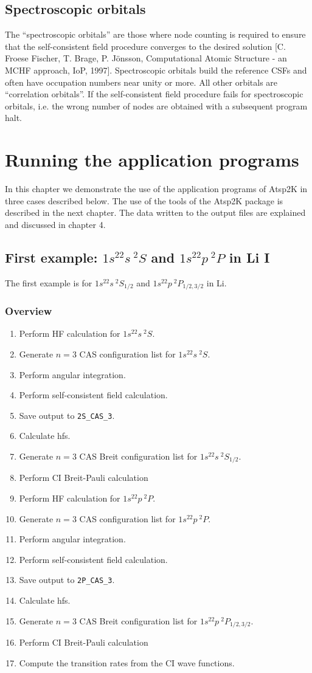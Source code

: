 \documentclass[fleqn,10pt]{book}
\begin{document}
\section{Spectroscopic orbitals}
The ``spectroscopic orbitals'' are those where node counting is
required to ensure that the self-consistent field procedure converges to the
desired solution [C. Froese Fischer, T. Brage, P. J\"onsson, Computational Atomic Structure - an MCHF approach, IoP, 1997]. Spectroscopic orbitals 
build the reference CSFs and often have occupation numbers near unity or more.  All other orbitals are ``correlation
orbitals''. If the self-consistent field procedure fails for spectroscopic orbitals, i.e. the wrong number of nodes are obtained with a subsequent program halt. 
\chapter{Running the application programs} 
In this chapter we demonstrate the use of the application programs of {\sc Atsp}2K in three cases described below. The use of the tools of the {\sc Atsp}2K package is described in the next chapter. The data written to the output files are explained and discussed in chapter 4. 
\section{First example: $1s^22s~^2S$ and $1s^22p~^2P$ in Li I}
The first example is for $1s^22s~^2S_{1/2}$ and $1s^22p~^2P_{1/2,3/2}$ in Li. 
\subsection*{Overview}
\begin{enumerate}
\item Perform HF calculation for $1s^22s~^2S$.
\item Generate $n = 3$ CAS configuration list for $1s^22s~^2S$.
\item Perform angular integration.
\item Perform self-consistent field calculation.
\item Save output to \verb+2S_CAS_3+. 
\item Calculate hfs.
\item Generate $n = 3$ CAS Breit configuration list for $1s^22s~^2S_{1/2}$.  
\item Perform CI Breit-Pauli calculation 
\item Perform HF calculation for $1s^22p~^2P$.
\item Generate $n = 3$ CAS configuration list for $1s^22p~^2P$.
\item Perform angular integration.
\item Perform self-consistent field calculation.
\item Save output to \verb+2P_CAS_3+. 
\item Calculate hfs.
\item Generate $n = 3$ CAS Breit configuration list for $1s^22p~^2P_{1/2,3/2}$.  
\item Perform CI Breit-Pauli calculation 
\item Compute the transition rates from the CI wave functions.
\end{enumerate} 
\end{document}
